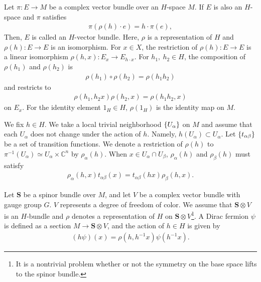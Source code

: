 \documentclass[11pt]{article}
\begin{document}
Let $\pi:E\to M$ be a complex vector bundle over an $H$-space $M$. If $E$ is also an $H$-space and $\pi $ satisfies
\begin{align}
    \pi ( \rho(h) \cdot e)= h \cdot \pi (e),
\end{align}
Then, $E$ is called an $H$-vector bundle. Here, $\rho$ is a representation of $H$ and $\rho(h) :E \to E$ is an isomorphism. For $x \in X$, the restriction of $\rho(h) :E \to E$ is a linear isomorphism $\rho(h,x):E_x \to E_{h \cdot x} $. For $h_1,~h_2 \in H$, the composition of $\rho(h_1)$ and $\rho(h_2)$ is 
\begin{align}
    \rho(h_1) \circ \rho(h_2)=\rho(h_1 h_2)
\end{align}
and restricts to 
\begin{align}
    \rho(h_1, h_2 x) \rho(h_2,x)=\rho(h_1 h_2,x)
\end{align}
on $E_x$. For the identity element $1_H \in H$, $\rho(1_H)$ is the identity map on $M$.

We fix $h \in H$. We take a local trivial neighborhood $\qty{U_\alpha}$ on $M$ and assume that each $U_\alpha$ does not change under the action of $h$. Namely, $h(U_\alpha) \subset U_\alpha$. Let $\qty{t_{\alpha \beta}}$ be a set of transition functions. We denote a restriction of $\rho(h)$ to $\pi^{-1}(U_\alpha) \simeq U_\alpha \times \mathbb{C}^n$ by $\rho_\alpha (h)$. When $x \in U_\alpha \cap U_\beta $, $\rho_\alpha (h)$ and $\rho_\beta (h)$ must satisfy
\begin{align}
    \rho_\alpha (h,x )t_{\alpha \beta}(x)= t_{\alpha \beta}(h x) \rho_\beta (h,x) .
\end{align}

Let $\mathbf{S}$ be a spinor bundle over $M$, and let $V$ be a complex vector bundle with gauge group $G$. $V$ represents a degree of freedom of color. We assume that $\mathbf{S} \otimes V$ is an $H$-bundle and $\rho$ denotes a representation of $H$ on $\mathbf{S} \otimes V$\footnote{It is a nontrivial problem whether or not the symmetry on the base space lifts to the spinor bundle.}. A Dirac fermion $\psi$ is defined as a section $M \to  \mathbf{S} \otimes V$, and the action of $h \in H$ is given by
\begin{align}\label{eq:action for section}
    (h\psi)(x) = \rho(h,h^{-1} x) \psi( h^{-1} x).
\end{align}

\end{document}
